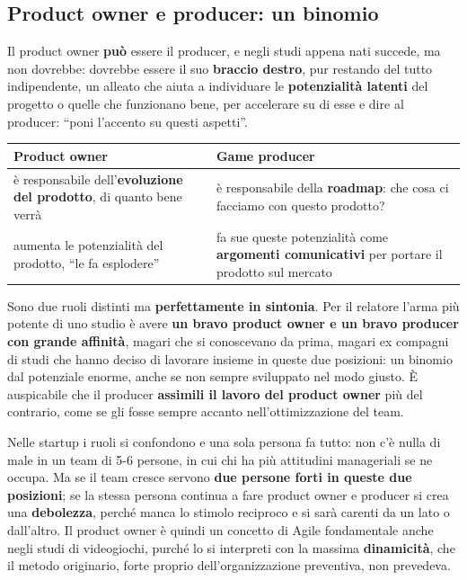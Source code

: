 \subsection{Product owner e producer: un binomio}

Il product owner \textbf{può} essere il producer, e negli studi appena nati
succede, ma non dovrebbe: dovrebbe essere il suo \textbf{braccio destro}, pur
restando del tutto indipendente, un alleato che aiuta a individuare le
\textbf{potenzialità latenti} del progetto o quelle che funzionano bene, per
accelerare su di esse e dire al producer: ``poni l'accento su questi aspetti''.
\begin{center}
  \begin{tabular}{@{}p{}p{}@{}}
    \toprule
    \textbf{Product owner} & \textbf{Game producer} \\
    \midrule
    è responsabile dell'\textbf{evoluzione del prodotto}, di quanto bene
    verrà & è responsabile della \textbf{roadmap}: che cosa ci facciamo con
    questo prodotto? \\
    aumenta le potenzialità del prodotto, ``le fa esplodere'' & fa sue queste
    potenzialità come \textbf{argomenti comunicativi} per portare il prodotto
    sul mercato \\
    \bottomrule
  \end{tabular}
\end{center}
Sono due ruoli distinti ma \textbf{perfettamente in sintonia}. Per il relatore
l'arma più potente di uno studio è avere \textbf{un bravo product owner e un
bravo producer con grande affinità}, magari che si conoscevano da prima, magari
ex compagni di studi che hanno deciso di lavorare insieme in queste due
posizioni: un binomio dal potenziale enorme, anche se non sempre sviluppato nel
modo giusto. È auspicabile che il producer \textbf{assimili il lavoro del
product owner} più del contrario, come se gli fosse sempre accanto
nell'ottimizzazione del team.

Nelle startup i ruoli si confondono e una sola persona fa tutto: non c'è nulla
di male in un team di 5-6 persone, in cui chi ha più attitudini manageriali se ne
occupa. Ma se il team cresce servono \textbf{due persone forti in queste due
posizioni}; se la stessa persona continua a fare product owner e producer si
crea una \textbf{debolezza}, perché manca lo stimolo reciproco e si sarà
carenti da un lato o dall'altro. Il product owner è quindi un concetto di Agile
fondamentale anche negli studi di videogiochi, purché lo si interpreti con la
massima \textbf{dinamicità}, che il metodo originario, forte proprio
dell'organizzazione preventiva, non prevedeva.

